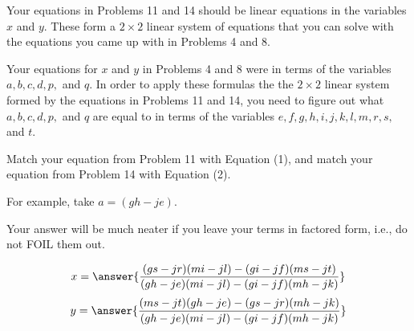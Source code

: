 \documentclass[number]{ximera}
\begin{document}
\begin{problem}
Your equations in Problems 11 and 14 should be linear equations in the variables $x$ and $y$.
These form a $2\times2$ linear system of equations that you can solve with the equations you came up with in Problems 4 and 8.
\begin{hint}
Your equations for $x$ and $y$ in Problems 4 and 8 were in terms of the variables $a,b,c,d,p,$ and $q$.
In order to apply these formulas the the $2 \times 2$ linear system formed by the equations in Problems 11 and 14, you need to figure out what $a,b,c,d,p,$ and $q$ are equal to in terms of the variables $e,f,g,h,i,j,k,l,m,r,s,$ and $t$.
\end{hint}
\begin{hint}Match your equation from Problem 11 with Equation (1), and match your equation from Problem 14 with Equation (2).\end{hint}
\begin{hint} For example, take $a=(gh-je)$.\end{hint}
\begin{hint}Your answer will be much neater if you leave your terms in factored form, i.e., do not FOIL them out.\end{hint}
\[x=\answer{\frac{(gs-jr)(mi-jl)-(gi-jf)(ms-jt)}{(gh-je)(mi-jl)-(gi-jf)(mh-jk)}}\]
\[y=\answer{\frac{(ms-jt)(gh-je)-(gs-jr)(mh-jk)}{(gh-je)(mi-jl)-(gi-jf)(mh-jk)}}\]
\end{problem}
\end{document}
